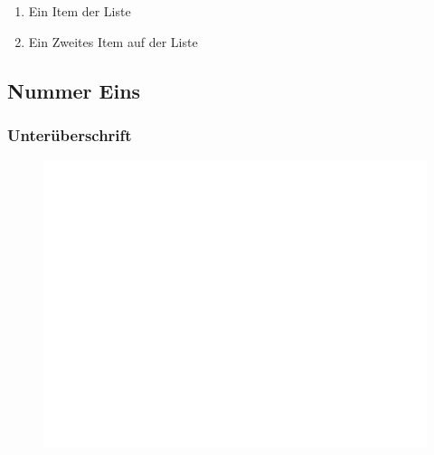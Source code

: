 \documentclass[12pt, a4paper, twoside, openany]{book}
\begin{document}
\begin{multicols}{2} %
        \Blindtext[1][1]
        \begin{enumerate}[label=\textbullet]
                \item Ein Item der Liste
                \item Ein Zweites Item auf der Liste
        \end{enumerate}

        \subsection*{Nummer Eins}
        \Blindtext[1][1]
        \subsubsection*{Unterüberschrift}
\end{multicols}
\begin{figure}[H] %
        \centering
        \includegraphics[width=.6\textwidth]{bilder/foo.png}
        \label{fig:piel}
\end{figure}
\end{document}
